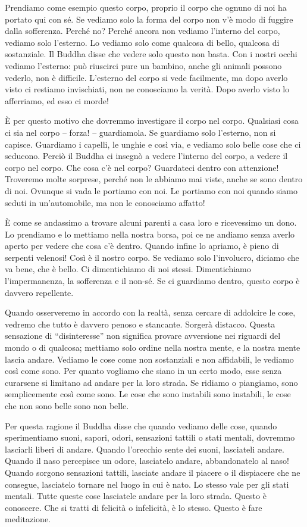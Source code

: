 Prendiamo come esempio questo corpo, proprio il corpo che ognuno di noi
ha portato qui con sé. Se vediamo solo la forma del corpo non v'è modo
di fuggire dalla sofferenza. Perché no? Perché ancora non vediamo
l'interno del corpo, vediamo solo l'esterno. Lo vediamo solo come
qualcosa di bello, qualcosa di sostanziale. Il Buddha disse che vedere
solo questo non basta. Con i nostri occhi vediamo l'esterno: può
riuscirci pure un bambino, anche gli animali possono vederlo, non è
difficile. L'esterno del corpo si vede facilmente, ma dopo averlo visto
ci restiamo invischiati, non ne conosciamo la verità. Dopo averlo visto
lo afferriamo, ed esso ci morde!

È per questo motivo che dovremmo investigare il corpo nel corpo.
Qualsiasi cosa ci sia nel corpo -- forza! -- guardiamola. Se guardiamo
solo l'esterno, non si capisce. Guardiamo i capelli, le unghie e così
via, e vediamo solo belle cose che ci seducono. Perciò il Buddha ci
insegnò a vedere l'interno del corpo, a vedere il corpo nel corpo. Che
cosa c'è nel corpo? Guardateci dentro con attenzione! Troveremo molte
sorprese, perché non le abbiamo mai viste, anche se sono dentro di noi.
Ovunque si vada le portiamo con noi. Le portiamo con noi quando siamo
seduti in un'automobile, ma non le conosciamo affatto!

È come se andassimo a trovare alcuni parenti a casa loro e ricevessimo
un dono. Lo prendiamo e lo mettiamo nella nostra borsa, poi ce ne
andiamo senza averlo aperto per vedere che cosa c'è dentro. Quando
infine lo apriamo, è pieno di serpenti velenosi! Così è il nostro corpo.
Se vediamo solo l'involucro, diciamo che va bene, che è bello. Ci
dimentichiamo di noi stessi. Dimentichiamo l'impermanenza, la
sofferenza e il non-sé. Se ci guardiamo dentro, questo corpo è davvero
repellente.

Quando osserveremo in accordo con la realtà, senza cercare di addolcire
le cose, vedremo che tutto è davvero penoso e stancante. Sorgerà
distacco. Questa sensazione di ``disinteresse'' non significa provare
avversione nei riguardi del mondo o di qualcosa; mettiamo solo ordine
nella nostra mente, e la nostra mente lascia andare. Vediamo le cose
come non sostanziali e non affidabili, le vediamo così come sono. Per
quanto vogliamo che siano in un certo modo, esse senza curarsene si
limitano ad andare per la loro strada. Se ridiamo o piangiamo, sono
semplicemente così come sono. Le cose che sono instabili sono instabili,
le cose che non sono belle sono non belle.

Per questa ragione il Buddha disse che quando vediamo delle cose, quando
sperimentiamo suoni, sapori, odori, sensazioni tattili o stati mentali,
dovremmo lasciarli liberi di andare. Quando l'orecchio sente dei suoni,
lasciateli andare. Quando il naso percepisce un odore, lasciatelo
andare, abbandonatelo al naso! Quando sorgono sensazioni tattili,
lasciate andare il piacere o il dispiacere che ne consegue, lasciatelo
tornare nel luogo in cui è nato. Lo stesso vale per gli stati mentali.
Tutte queste cose lasciatele andare per la loro strada. Questo è
conoscere. Che si tratti di felicità o infelicità, è lo stesso. Questo è
fare meditazione.

